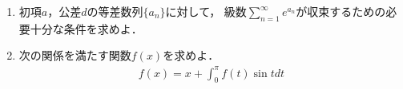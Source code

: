 \documentclass[../../main.tex]{subfiles}
\begin{document}
\begin{enumerate}
  \item 初項$a$，公差$d$の等差数列$\{ a_n \}$に対して，
    級数$\displaystyle\sum_{n=1}^\infty e^{a_n}$が収束するための必要十分な条件を求めよ．
  \item 次の関係を満たす関数$f(x)$を求めよ．
    \begin{align}
      f(x)=x+\int_0^\pi f(t)\sin t dt
    \end{align}
\end{enumerate}
\end{document}
